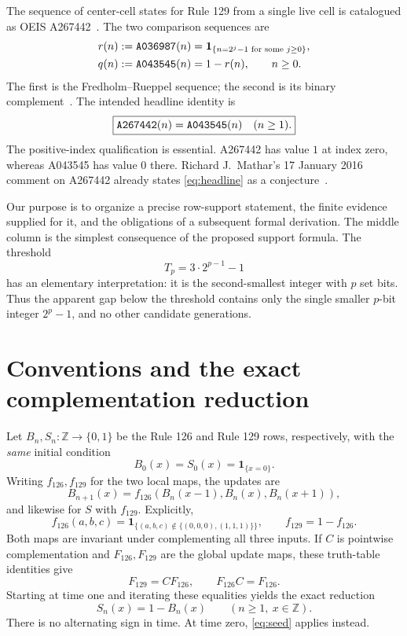 \documentclass[11pt]{article}
\newcommand{\ind}{\mathbf{1}}
\newcommand{\Z}{\mathbb{Z}}
\newcommand{\seq}[1]{\text{\texttt{#1}}}
\begin{document}
The sequence of center-cell states for Rule 129 from a single live cell is
catalogued as OEIS A267442~\cite{oeis267442}. The two comparison sequences are
\begin{align}
 r(n)&:=\seq{A036987}(n)
       =\ind_{\{n=2^j-1\text{ for some }j\geq0\}},\label{eq:rueppel}\\
 q(n)&:=\seq{A043545}(n)=1-r(n),\qquad n\geq0.
       \label{eq:q}
\end{align}
The first is the Fredholm--Rueppel sequence; the second is its binary
complement~\cite{oeis036987,oeis043545}. The intended headline identity is
\begin{equation}
 \boxed{\seq{A267442}(n)=\seq{A043545}(n)\quad(n\geq1).}
 \label{eq:headline}
\end{equation}
The positive-index qualification is essential. A267442 has value $1$ at
index zero, whereas A043545 has value $0$ there. Richard J.\ Mathar's
17 January 2016 comment on A267442 already states
\eqref{eq:headline} as a conjecture~\cite{oeis267442}.

Our purpose is to organize a precise row-support statement, the finite
evidence supplied for it, and the obligations of a subsequent formal
derivation. The middle column is the simplest consequence of the proposed
support formula. The threshold
\[
 T_p=3\cdot2^{p-1}-1
\]
has an elementary interpretation: it is the second-smallest integer with
$p$ set bits. Thus the apparent gap below the threshold contains only the
single smaller $p$-bit integer $2^p-1$, and no other candidate generations.

\section{Conventions and the exact complementation reduction}
\label{sec:conventions}

Let $B_n,S_n:\Z\longrightarrow\{0,1\}$ be the Rule 126 and Rule 129 rows,
respectively, with the \emph{same} initial condition
\begin{equation}
 B_0(x)=S_0(x)=\ind_{\{x=0\}}.
 \label{eq:seed}
\end{equation}
Writing $f_{126},f_{129}$ for the two local maps, the updates are
\[
 B_{n+1}(x)=f_{126}(B_n(x-1),B_n(x),B_n(x+1)),
\]
and likewise for $S$ with $f_{129}$. Explicitly,
\[
 f_{126}(a,b,c)=\ind_{\{(a,b,c)\notin\{(0,0,0),(1,1,1)\}\}},
 \qquad f_{129}=1-f_{126}.
\]
Both maps are invariant under complementing all three inputs. If $C$ is
pointwise complementation and $F_{126},F_{129}$ are the global update maps,
these truth-table identities give
\[
 F_{129}=C F_{126},\qquad F_{126}C=F_{126}.
\]
Starting at time one and iterating these equalities yields the exact reduction
\begin{equation}
 S_n(x)=1-B_n(x)\qquad(n\geq1,\ x\in\Z).
 \label{eq:complement}
\end{equation}
There is no alternating sign in time. At time zero, \eqref{eq:seed} applies
instead.
\end{document}
